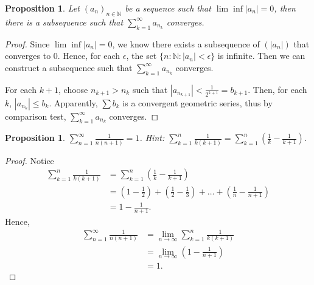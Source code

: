 \documentclass{article}
\newtheorem{proposition}[thm]{Proposition}
\begin{document}
\begin{proposition}
    Let $(a_n)_{n\in\mathbb{N}}$ be a sequence such that $\lim\inf |a_n|=0$, then there is a 
    subsequence such that $\sum_{k=1}^{\infty}a_{n_k}$ converges.
\end{proposition}
\begin{proof}
    Since $\lim\inf |a_n|=0$, we know there exists a subsequence of $(|a_n|)$ that converges to 0. 
    Hence, for each $\epsilon$, the set $\{n:\mathbb{N}:|a_n|<\epsilon\}$ is infinite. Then 
    we can construct a subsequence such that $\sum_{k=1}^{\infty}a_{n_k}$ converges.

    For each $k+1$, choose $n_{k+1}>n_k$ such that $|a_{n_{k+1}}|<\frac{1}{2^{k+1}}=b_{k+1}$. Then, 
    for each $k$, $|a_{n_k}|\le b_k$. Apparently, $\sum b_k$ is a convergent geometric series, thus 
    by comparison test, $\sum_{k=1}^\infty a_{n_k}$ converges.
\end{proof}

\begin{proposition}
    $\sum_{n=1}^{\infty}\frac{1}{n(n+1)}=1$. Hint: $\sum_{k=1}^{n}\frac{1}{k(k+1)}=
    \sum_{k=1}^{n}\left(\frac{1}{k}-\frac{1}{k+1}\right)$.
\end{proposition}
\begin{proof}
    Notice 
    \begin{align*}
        \sum_{k=1}^{n}\frac{1}{k(k+1)} & = \sum_{k=1}^{n}\left(\frac{1}{k}-\frac{1}{k+1}\right) \\
        & = \left(1-\frac{1}{2}\right) + \left(\frac{1}{2}-\frac{1}{3}\right) + \dots +
        \left(\frac{1}{n}-\frac{1}{n+1}\right) \\
        & = 1 - \frac{1}{n+1}.
    \end{align*}
    Hence, 
    \begin{align*}
        \sum_{n=1}^{\infty}\frac{1}{n(n+1)} & = \lim_{n\to\infty}\sum_{k=1}^{n}\frac{1}{k(k+1)} \\
        & = \lim_{n\to\infty}\left(1 - \frac{1}{n+1}\right) \\
        & = 1.
    \end{align*}
\end{proof}
\end{document}
